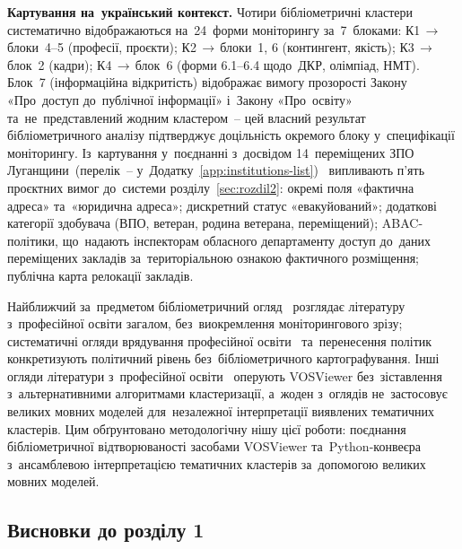 \textbf{Картування на~український контекст.} Чотири бібліометричні кластери систематично відображаються на~24~форми моніторингу за~7~блоками: К1\,$\to$\,блоки~4--5 (професії, проєкти); К2\,$\to$\,блоки~1, 6 (контингент, якість); К3\,$\to$\,блок~2 (кадри); К4\,$\to$\,блок~6 (форми 6.1--6.4 щодо~ДКР, олімпіад, НМТ). Блок~7 (інформаційна відкритість) відображає вимогу прозорості Закону «Про~доступ до~публічної інформації» і~Закону «Про~освіту» та~не~представлений жодним кластером~-- цей власний результат бібліометричного аналізу підтверджує доцільність окремого блоку у~специфікації моніторингу. Із~картування у~поєднанні з~досвідом 14~переміщених ЗПО Луганщини~(перелік~-- у~Додатку~\ref{app:institutions-list})~\cite{NMTsPTO2025, Semenenko2023DisplacedHEI, Bazhan2025PPTERisks} випливають п'ять проєктних вимог до~системи розділу~\ref{sec:rozdil2}: окремі поля «фактична адреса» та~«юридична адреса»; дискретний статус «евакуйований»; додаткові категорії здобувача (ВПО, ветеран, родина ветерана, переміщений); ABAC-політики, що~надають інспекторам обласного департаменту доступ до~даних переміщених закладів за~територіальною ознакою фактичного розміщення; публічна карта релокації закладів.

Найближчий за~предметом бібліометричний огляд~\cite{Karantali2025VETBiblio} розглядає літературу з~професійної освіти загалом, без~виокремлення моніторингового зрізу; систематичні огляди врядування професійної освіти~\cite{Mende2025VETgovernance} та~перенесення політик~\cite{Ciantar2025VETPolicy} конкретизують політичний рівень без~бібліометричного картографування. Інші огляди літератури з~професійної освіти~\cite{Calero2020Transversal, Adjei2023GreenTVET, Husaeni2023VocSchoolVOS, Omar2024TVETIndustry, Tripney2013TVETLMIC, Christidis2019NursingVET} оперують VOSViewer без~зіставлення з~альтернативними алгоритмами кластеризації, а~жоден з~оглядів не~застосовує великих мовних моделей для~незалежної інтерпретації виявлених тематичних кластерів. Цим обґрунтовано методологічну нішу цієї роботи: поєднання бібліометричної відтворюваності засобами VOSViewer та~Python-конвеєра з~ансамблевою інтерпретацією тематичних кластерів за~допомогою великих мовних моделей.

\subsection*{Висновки до розділу 1}

